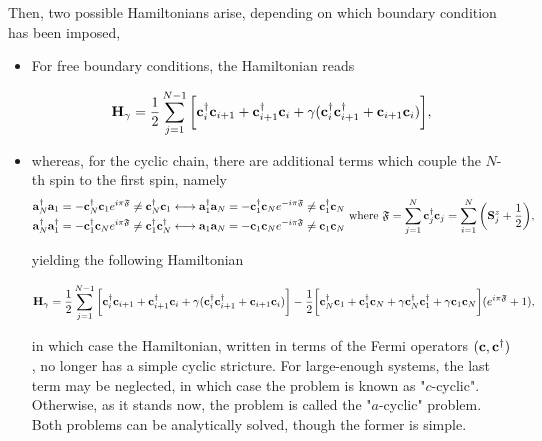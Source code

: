 \documentclass{homework}
\begin{document}
Then, two possible Hamiltonians arise, depending on which boundary condition has been imposed,

\begin{itemize}
    \item For free boundary conditions, the Hamiltonian reads 
    
    \begin{equation}
        {\bf H}_{\gamma} = \frac{1}{2} \sum_{j = 1}^{N-1} \bigg[ {\bf c}_i^\dagger {\bf c}_{i+1} + {\bf c}_{i+1}^\dagger {\bf c}_{i} + \gamma ( {\bf c}_i^\dagger {\bf c}_{i+1}^\dagger +  {\bf c}_{i+1} {\bf c}_{i})\bigg],
    \end{equation}
    
    \item whereas, for the cyclic chain, there are additional terms which couple the $N$-th spin to the first spin, namely 
    \begin{equation}
    \begin{split}
        {\bf a}_N^\dagger {\bf a}_1 = - {\bf c}_N^\dagger {\bf c}_1 e^{i \pi \mathfrak{F}} \neq {\bf c}_N^\dagger {\bf c}_1 \longleftrightarrow {\bf a}_1^\dagger {\bf a}_N = - {\bf c}_1^\dagger {\bf c}_N e^{-i \pi \mathfrak{F}} \neq {\bf c}_1^\dagger {\bf c}_N \\
        {\bf a}_N^\dagger {\bf a}_1^\dagger = - {\bf c}_1^\dagger {\bf c}_N e^{i \pi \mathfrak{F}} \neq {\bf c}_1^\dagger {\bf c}_N^\dagger \longleftrightarrow {\bf a}_1 {\bf a}_N= - {\bf c}_1 {\bf c}_N e^{-i \pi \mathfrak{F}} \neq {\bf c}_1 {\bf c}_N
    \end{split} \textnormal{ where } \mathfrak{F} = \sum_{j=1}^{N} {\bf c}_j^\dagger {\bf c}_j = \sum_{i=1}^{N} \bigg({\bf S}_j^z + \frac{1}{2}\bigg),
    \end{equation}
    
    yielding the following Hamiltonian 
    
    \begin{equation}
        {\bf H}_{\gamma} = \frac{1}{2} \sum_{j = 1}^{N-1} \bigg[ {\bf c}_i^\dagger {\bf c}_{i+1} + {\bf c}_{i+1}^\dagger {\bf c}_{i} + \gamma ( {\bf c}_i^\dagger {\bf c}_{i+1}^\dagger +  {\bf c}_{i+1} {\bf c}_{i})\bigg] - \frac{1}{2} \bigg[{\bf c}_N^\dagger {\bf c}_1 + {\bf c}_1^\dagger {\bf c}_N + \gamma {\bf c}_N^\dagger {\bf c}_1^\dagger + \gamma {\bf c}_1 {\bf c}_N\bigg] (e^{i\pi \mathfrak{F}} + 1),
    \end{equation}
    
    in which case the Hamiltonian, written in terms of the Fermi operators $({\bf c}, {\bf c}^\dagger)$, no longer has a simple cyclic stricture. For large-enough systems, the last term may be neglected, in which case the problem is known as "$c$-cyclic". Otherwise, as it stands now, the problem is called the "$a$-cyclic" problem. Both problems can be analytically solved, though the former is simple. 
\end{itemize}
\end{document}
